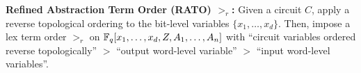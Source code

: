





\begin{Definition}
\label{def:rato}
{\bf Refined Abstraction Term Order (RATO) $>_r$:} 
Given a circuit $C$, apply a reverse topological ordering to the bit-level
variables $\{x_1, \dots, x_d\}$.
Then, impose a lex term
order $>_r$ on ${\mathbb{F}}_{q}[x_1, \dots, x_d, Z, A_1, \dots, A_n]$ with ``circuit 
variables ordered reverse topologically'' $>$ 
``output word-level variable'' $>$ ``input word-level variables''. 
\end{Definition}

